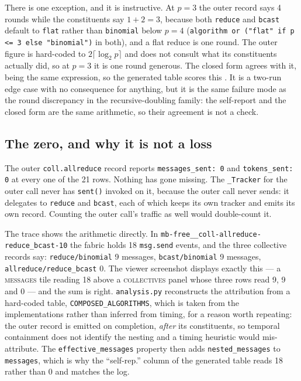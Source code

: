 \documentclass[11pt]{article}
\begin{document}
There is one exception, and it is instructive. At $p=3$ the outer record says 4 rounds while the
constituents say $1+2=3$, because both \texttt{reduce} and \texttt{bcast} default to
\texttt{flat} rather than \texttt{binomial} below $p=4$ (\texttt{algorithm or ("flat" if p <= 3
else "binomial")} in both), and a flat reduce is one round. The outer figure is hard-coded to
$2\lceil\log_2 p\rceil$ and does not consult what its constituents actually did, so at $p=3$ it
is one round generous. The closed form agrees with it, being the same expression, so the
generated table scores this \modelok{}. It is a two-run edge case with no consequence for
anything, but it is the same failure mode as the round discrepancy in the recursive-doubling
family: the self-report and the closed form are the same arithmetic, so their agreement is not a
check.

\subsection{The zero, and why it is not a loss}

The outer \texttt{coll.allreduce} record reports \texttt{messages\_sent: 0} and
\texttt{tokens\_sent: 0} at every one of the 21 rows. Nothing has gone missing. The
\texttt{\_Tracker} for the outer call never has \texttt{sent()} invoked on it, because the outer
call never sends: it delegates to \texttt{reduce} and \texttt{bcast}, each of which keeps its own
tracker and emits its own record. Counting the outer call's traffic as well would double-count
it.

The trace shows the arithmetic directly. In
\texttt{mb-free\_\_coll-allreduce-reduce\_bcast-10} the fabric holds 18 \texttt{msg.send} events,
and the three collective records say: \texttt{reduce/binomial} 9 messages,
\texttt{bcast/binomial} 9 messages, \texttt{allreduce/reduce\_bcast} 0. The viewer screenshot
displays exactly this --- a \textsc{messages} tile reading 18 above a \textsc{collectives} panel
whose three rows read 9, 9 and 0 --- and the sum is right. \texttt{analysis.py} reconstructs the
attribution from a hard-coded table, \texttt{COMPOSED\_ALGORITHMS}, which is taken from the
implementations rather than inferred from timing, for a reason worth repeating: the outer record
is emitted on completion, \emph{after} its constituents, so temporal containment does not
identify the nesting and a timing heuristic would mis-attribute. The
\texttt{effective\_messages} property then adds \texttt{nested\_messages} to \texttt{messages},
which is why the ``self-rep.'' column of the generated table reads 18 rather than 0 and matches
the log.
\end{document}
